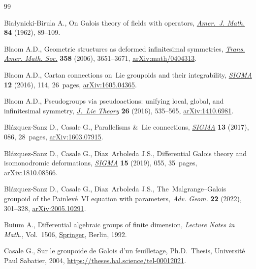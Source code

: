 \documentclass[10pt,a4paper]{amsart}
\numberwithin{equation}{section}
\theoremstyle{definition}
\begin{document}
\begin{thebibliography}{99}
\footnotesize\itemsep=0pt

Bia{\l}ynicki-Birula A., On {G}alois theory of fields with operators,
 \href{https://doi.org/10.2307/2372805}{\textit{Amer.~J. Math.}} \textbf{84}
 (1962), 89--109.

Blaom A.D., Geometric structures as deformed infinitesimal symmetries,
 \href{https://doi.org/10.1090/S0002-9947-06-04057-8}{\textit{Trans. Amer.
 Math. Soc.}} \textbf{358} (2006), 3651--3671,
 \href{https://arxiv.org/abs/math/0404313}{arXiv:math/0404313}.

Blaom A.D., Cartan connections on~{L}ie groupoids and their integrability,
 \href{https://doi.org/10.3842/SIGMA.2016.114}{\textit{SIGMA}} \textbf{12}
 (2016), 114, 26~pages,
 \href{https://arxiv.org/abs/1605.04365}{arXiv:1605.04365}.

Blaom A.D., Pseudogroups via pseudoactions: unifying local, global, and
 infinitesimal symmetry,
 \href{https://doi.org/10.5802/jolt.900}{\textit{J.~Lie Theory}} \textbf{26}
 (2016), 535--565, \href{https://arxiv.org/abs/1410.6981}{arXiv:1410.6981}.

Bl\'azquez-Sanz D., Casale G., Parallelisms \&~{L}ie connections,
 \href{https://doi.org/10.3842/SIGMA.2017.086}{\textit{SIGMA}} \textbf{13}
 (2017), 086, 28~pages,
 \href{https://arxiv.org/abs/1603.07915}{arXiv:1603.07915}.

Bl\'azquez-Sanz D., Casale G., D\'{\i}az~Arboleda J.S., Differential {G}alois
 theory and isomonodromic deformations,
 \href{https://doi.org/10.3842/SIGMA.2019.055}{\textit{SIGMA}} \textbf{15}
 (2019), 055, 35~pages,
 \href{https://arxiv.org/abs/1810.08566}{arXiv:1810.08566}.

Bl\'azquez-Sanz D., Casale G., D\'{\i}az~Arboleda J.S.,
 The~{M}algrange--{G}alois groupoid of the {P}ainlev\'e~{VI} equation with
 parameters, \href{https://doi.org/10.1515/advgeom-2022-0010}{\textit{Adv.
 Geom.}} \textbf{22} (2022), 301--328,
 \href{https://arxiv.org/abs/2005.10291}{arXiv:2005.10291}.

Buium A., Differential algebraic groups of finite dimension, \textit{Lecture
 Notes in Math.}, Vol.~1506,
 \href{https://doi.org/10.1007/BFb0087235}{Springer}, Berlin, 1992.

Casale G., Sur le groupoide de Galois d'un feuilletage, Ph.D.~Thesis,
 {U}niversit\'e Paul Sabatier, 2004,
 \url{https://theses.hal.science/tel-00012021}.


\end{thebibliography}
\end{document}
